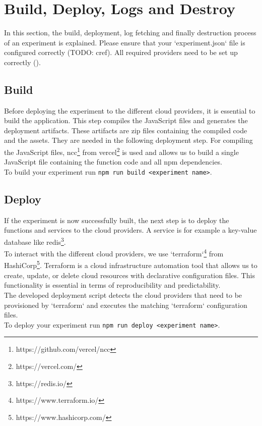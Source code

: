 \documentclass[../main.tex]{subfiles}
\begin{document}
\section{Build, Deploy, Logs and Destroy}\label{sec:builddeploylogsanddestroy}
In this section, the build, deployment, log fetching and finally destruction process of an experiment is explained. Please ensure that your `experiment.json` file is configured correctly (TODO: cref). All required providers need to be set up correctly ().

\subsection{Build}\label{sec:build}
Before deploying the experiment to the different cloud providers, it is essential to build the application. This step compiles the JavaScript files and generates the deployment artifacts. These artifacts are zip files containing the compiled code and the assets. They are needed in the following deployment step. For compiling the JavaScript files, ncc\footnote{https://github.com/vercel/ncc} from vercel\footnote{https://vercel.com/} is used and allows us to build a single JavaScript file containing the function code and all npm dependencies.\\
To build your experiment run \texttt{npm run build <experiment name>}.

\subsection{Deploy}\label{sec:deploy}
If the experiment is now successfully built, the next step is to deploy the functions and services to the cloud providers. A service is for example a key-value database like redis\footnote{https://redis.io/}. \\
To interact with the different cloud providers, we use `terraform`\footnote{https://www.terraform.io/} from HashiCorp\footnote{https://www.hashicorp.com/}. Terraform is a cloud infrastructure automation tool that allows us to create, update, or delete cloud resources with declarative configuration files. This functionality is essential in terms of reproducibility and predictability.\\
The developed deployment script detects the cloud providers that need to be provisioned by `terraform` and executes the matching `terraform` configuration files.\\
To deploy your experiment run \texttt{npm run deploy <experiment name>}.\\
\end{document}

